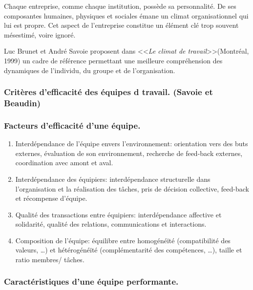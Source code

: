 \documentclass[12pt]{article}
\begin{document}
	Chaque  entreprise,  comme  chaque  institution,  possède  sa  personnalité.  De  ses  composantes humaines, physiques et sociales émane un climat organisationnel qui lui est propre. Cet aspect de l'entreprise constitue un élément clé trop souvent mésestimé, voire ignoré. \newline
	
Luc  Brunet  et  André  Savoie  proposent  dans <<\textit{Le  climat  de  travail}>>(Montréal,  1999)  un  cadre  de  référence permettant une meilleure compréhension des dynamiques de l'individu, du groupe et de l'organisation. 
	
	\subsubsection*{Critères d'efficacité des équipes d travail. (Savoie et Beaudin)}
	
	\subsubsection*{Facteurs d'efficacité d'une équipe.}
	
	\begin{enumerate}
	\item Interdépendance de l'équipe envers l'environnement: orientation vers des buts externes, évaluation de son environnement, recherche de feed-back externes, coordination avec amont et aval.
	\item Interdépendance des équipiers: interdépendance structurelle dans l'organisation et la réalisation des tâches, pris de décision collective, feed-back et récompense d'équipe.
	\item Qualité des transactions entre équipiers: interdépendance affective et solidarité, qualité des relations, communications et interactions.
	\item Composition de l'équipe: équilibre entre homogénéïté (compatibilité des valeurs, …) et hétérogénéïté (complémentarité des compétences, …), taille et ratio membres/ tâches.
	\end{enumerate}
	
	\subsubsection*{Caractéristiques d'une équipe performante.}
	
\end{document}
